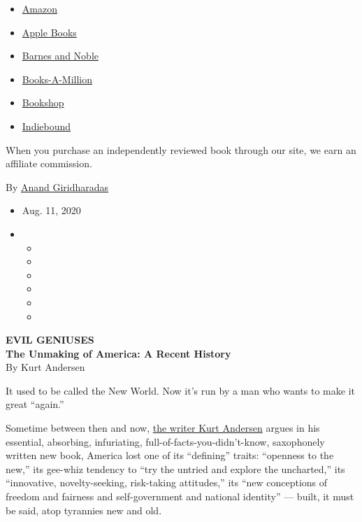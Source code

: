 \begin{itemize}
\tightlist
\item
  \href{https://www.amazon.com/gp/search?index=books\&tag=NYTBSREV-20\&field-keywords=Evil+Geniuses+Kurt+Andersen}{Amazon}
\item
  \href{https://du-gae-books-dot-nyt-du-prd.appspot.com/buy?title=Evil+Geniuses\&author=Kurt+Andersen}{Apple
  Books}
\item
  \href{https://www.anrdoezrs.net/click-7990613-11819508?url=https\%3A\%2F\%2Fwww.barnesandnoble.com\%2Fw\%2F\%3Fean\%3D9781984801340}{Barnes
  and Noble}
\item
  \href{https://www.anrdoezrs.net/click-7990613-35140?url=https\%3A\%2F\%2Fwww.booksamillion.com\%2Fp\%2FEvil\%2BGeniuses\%2FKurt\%2BAndersen\%2F9781984801340}{Books-A-Million}
\item
  \href{https://bookshop.org/a/3546/9781984801340}{Bookshop}
\item
  \href{https://www.indiebound.org/book/9781984801340?aff=NYT}{Indiebound}
\end{itemize}

When you purchase an independently reviewed book through our site, we
earn an affiliate commission.

By \href{https://www.nytimes3xbfgragh.onion/by/anand-giridharadas}{Anand
Giridharadas}

\begin{itemize}
\item
  Aug. 11, 2020
\item
  \begin{itemize}
  \item
  \item
  \item
  \item
  \item
  \item
  \end{itemize}
\end{itemize}

\textbf{EVIL GENIUSES}\\
\textbf{The Unmaking of America: A Recent History}\\
By Kurt Andersen

It used to be called the New World. Now it's run by a man who wants to
make it great ``again.''

Sometime between then and now, \href{https://www.kurtandersen.com}{the
writer Kurt Andersen} argues in his essential, absorbing, infuriating,
full-of-facts-you-didn't-know, saxophonely written new book, America
lost one of its ``defining'' traits: ``openness to the new,'' its
gee-whiz tendency to ``try the untried and explore the uncharted,'' its
``innovative, novelty-seeking, risk-taking attitudes,'' its ``new
conceptions of freedom and fairness and self-government and national
identity'' --- built, it must be said, atop tyrannies new and old.

